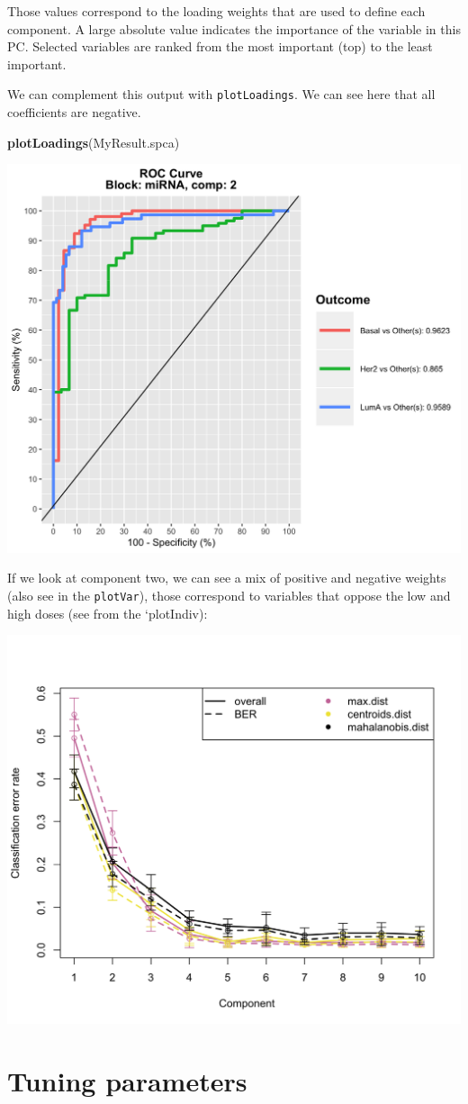 \documentclass[]{book}
\newenvironment{Shaded}{\begin{snugshade}}{\end{snugshade}}
\newcommand{\KeywordTok}[1]{\textcolor[rgb]{0.13,0.29,0.53}{\textbf{#1}}}
\newcommand{\NormalTok}[1]{#1}
\theoremstyle{definition}
\theoremstyle{definition}
\theoremstyle{definition}
\theoremstyle{remark}
\begin{document}
Those values correspond to the loading weights that are used to define
each component. A large absolute value indicates the importance of the
variable in this PC. Selected variables are ranked from the most
important (top) to the least important.

We can complement this output with \texttt{plotLoadings}. We can see
here that all coefficients are negative.

\begin{Shaded}
\begin{Highlighting}[]
\KeywordTok{plotLoadings}\NormalTok{(MyResult.spca)}
\end{Highlighting}
\end{Shaded}

\begin{center}\includegraphics[width=0.5\linewidth]{Figures/unnamed-chunk-12-1} \end{center}

If we look at component two, we can see a mix of positive and negative
weights (also see in the \texttt{plotVar}), those correspond to
variables that oppose the low and high doses (see from the `plotIndiv):

\begin{center}\includegraphics[width=0.5\linewidth]{Figures/unnamed-chunk-13-1} \end{center}

\section{Tuning parameters}\label{tuning-parameters}
\end{document}
